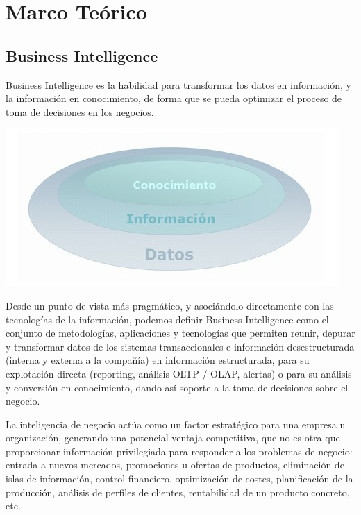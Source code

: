\section{Marco Teórico} 
\subsection{Business Intelligence}

Business Intelligence es la habilidad para transformar los datos en información, y la información en conocimiento, de forma que se pueda optimizar el proceso de toma de decisiones en los negocios.\newline

\begin{center}
\includegraphics{images/bi/bi-cid}\\
\end{center}

Desde un punto de vista más pragmático, y asociándolo directamente con las tecnologías de la información, podemos definir Business Intelligence como el conjunto de metodologías, aplicaciones y tecnologías que permiten reunir, depurar y transformar datos de los sistemas transaccionales e información desestructurada (interna y externa a la compañía) en información estructurada, para su explotación directa (reporting, análisis OLTP / OLAP, alertas) o para su análisis y conversión en conocimiento, dando así soporte a la toma de decisiones sobre el negocio.\newline

La inteligencia de negocio actúa como un factor estratégico para una empresa u organización, generando una potencial ventaja competitiva, que no es otra que proporcionar información privilegiada para responder a los problemas de negocio: entrada a nuevos mercados, promociones u ofertas de productos, eliminación de islas de información, control financiero, optimización de costes, planificación de la producción, análisis de perfiles de clientes, rentabilidad de un producto concreto, etc.\newline

